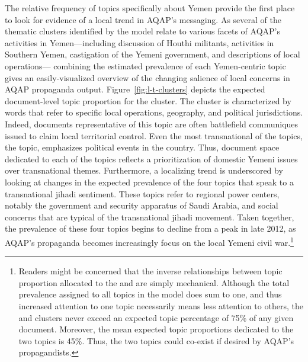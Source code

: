 The relative frequency of topics specifically about Yemen provide the
first place to look for evidence of a local trend in AQAP's messaging. As several of the thematic clusters identified by the model relate to various facets of AQAP's activities in Yemen---including discussion of Houthi militants, activities in Southern Yemen, castigation of the Yemeni government, and descriptions of local operations--- combining the estimated prevalence of each Yemen-centric topic gives an easily-visualized overview of the changing salience of local concerns in AQAP propaganda output. Figure~\ref{fig:l-t-clusters} depicts the expected document-level topic
proportion for the  cluster. The cluster is characterized by words that refer to specific local operations, geography, and political jurisdictions.  Indeed, documents representative of this topic are often battlefield communiques issued to claim local
territorial control. Even the most transnational of the topics, the
 topic, emphasizes political events in the country.
Thus, document space dedicated to each of the 
topics reflects a prioritization of domestic Yemeni issues over
transnational themes. Furthermore, a localizing trend is underscored by looking at changes in the expected prevalence of the four topics that speak to a transnational jihadi sentiment. These topics refer to regional power centers, notably the government and security apparatus of Saudi Arabia, and social concerns that are typical of the transnational jihadi movement. Taken together, the prevalence of these four topics begins to decline from a peak in late 2012, as AQAP's propaganda becomes increasingly focus on the local Yemeni civil war.\footnote{Readers might be concerned that the inverse relationships between topic proportion allocated to the  and  are simply mechanical. Although the total prevalence assigned to all topics in the model does sum to one, and thus increased attention to one topic necessarily means less attention to others, the  and  clusters never exceed an expected topic percentage of 75\%
of any given document. Moreover, the mean expected topic proportions dedicated to the two topics is 45\%. Thus, the two topics could co-exist if desired by AQAP's propagandists.}

